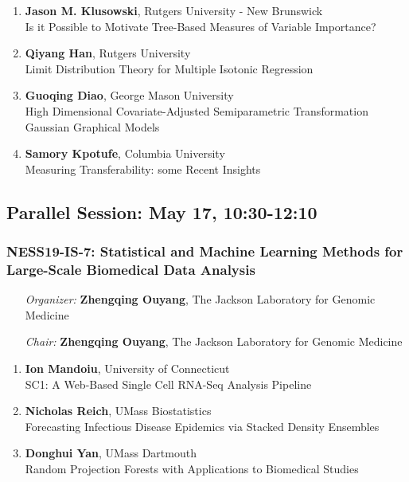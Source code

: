 \begin{enumerate}
\item \textbf{Jason M. Klusowski}, Rutgers University - New Brunswick \\
Is it Possible to Motivate Tree-Based Measures of Variable Importance?
\item \textbf{Qiyang Han}, Rutgers University \\
Limit Distribution Theory for Multiple Isotonic Regression
\item \textbf{Guoqing Diao}, George Mason University \\
High Dimensional Covariate-Adjusted Semiparametric Transformation Gaussian Graphical Models
\item \textbf{Samory Kpotufe}, Columbia University \\
Measuring Transferability: some Recent Insights
\end{enumerate}

\subsection*{Parallel Session: May 17, 10:30-12:10}

\subsubsection*{NESS19-IS-7: Statistical and Machine Learning Methods for Large-Scale Biomedical Data Analysis}

\begin{enumerate}[align=left]
\item [\emph{Organizer:}] \textbf{Zhengqing Ouyang}, The Jackson Laboratory for Genomic Medicine \\
\item [\emph{Chair:}] \textbf{Zhengqing Ouyang}, The Jackson Laboratory for Genomic Medicine
\end{enumerate}

\begin{enumerate}
\item \textbf{Ion Mandoiu}, University of Connecticut \\
SC1: A Web-Based Single Cell RNA-Seq Analysis Pipeline
\item \textbf{Nicholas Reich}, UMass Biostatistics \\
Forecasting Infectious Disease Epidemics via Stacked Density Ensembles
\item \textbf{Donghui Yan}, UMass Dartmouth \\
Random Projection Forests with Applications to Biomedical Studies
\end{enumerate}

